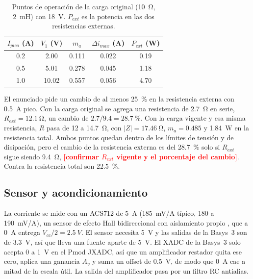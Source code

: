 \documentclass[journal]{IEEEtran}
\newcommand{\pendiente}[1]{\textcolor{red}{\textbf{[#1]}}}
\begin{document}
\begin{table}[!ht]
	\centering
	\caption{Puntos de operación de la carga original (\SI{10}{\ohm}, \SI{2}{mH}) con \SI{18}{V}. $P_{ext}$ es la potencia en las dos resistencias externas.}
	\label{tab:candidato}
	\begin{tabular}{ccccc}
		\toprule
		$I_{pico}$ (A) & $V_1$ (V) & $m_a$ & $\Delta i_{max}$ (A) & $P_{ext}$ (W) \\
		\midrule
		\num{0.2} & \num{2.00} & \num{0.111} & \num{0.022} & \num{0.19} \\
		\num{0.5} & \num{5.01} & \num{0.278} & \num{0.045} & \num{1.18} \\
		\num{1.0} & \num{10.02} & \num{0.557} & \num{0.056} & \num{4.70} \\
		\bottomrule
	\end{tabular}
\end{table}

El enunciado pide un cambio de al menos \SI{25}{\percent} en la resistencia externa con \SI{0.5}{A} pico. Con la carga original se agrega una resistencia de \SI{2.7}{\ohm} en serie, $R_{ext}=\SI{12.1}{\ohm}$, un cambio de $2.7/9.4=\SI{28.7}{\percent}$. Con la carga vigente y esa misma resistencia, $R$ pasa de \num{12} a \SI{14.7}{\ohm}, con $|Z|=\SI{17.46}{\ohm}$, $m_a=0.485$ y \SI{1.84}{W} en la resistencia total. Ambos puntos quedan dentro de los límites de tensión y de disipación, pero el cambio de la resistencia externa es del \SI{28.7}{\percent} solo si $R_{ext}$ sigue siendo \SI{9.4}{\ohm}, \pendiente{confirmar $R_{ext}$ vigente y el porcentaje del cambio}. Contra la resistencia total son \SI{22.5}{\percent}.

\subsection{Sensor y acondicionamiento}
\label{sec:sensor}
La corriente se mide con un ACS712 de \SI{5}{A} (\SI{185}{mV/A} típico, \num{180} a \SI{190}{mV/A}), un sensor de efecto Hall bidireccional con aislamiento propio \cite{acs712}, que a \SI{0}{A} entrega $V_{cc}/2=\SI{2.5}{V}$. El sensor necesita \SI{5}{V} y las salidas de la Basys~3 son de \SI{3.3}{V}, así que lleva una fuente aparte de \SI{5}{V}. El XADC de la Basys~3 solo acepta \SI{0}{} a \SI{1}{V} en el Pmod JXADC, así que un amplificador restador quita ese cero, aplica una ganancia $A_v$ y suma un offset de \SI{0.5}{V}, de modo que \SI{0}{A} cae a mitad de la escala útil. La salida del amplificador pasa por un filtro RC antialias.
\end{document}

